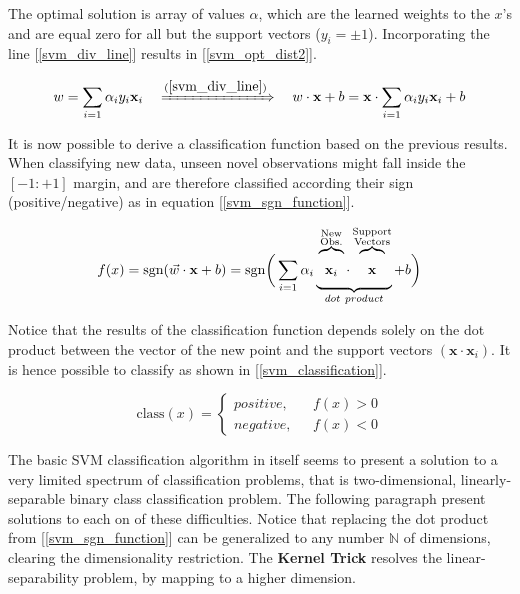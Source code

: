 	The optimal solution is array of values $\alpha$, which are the learned weights to the $x$'s and are equal zero for all but the support vectors ($y_i = \pm1 $). Incorporating the line [\ref{svm_div_line}] results in [\ref{svm_opt_dist2}].
	
	\begin{equation}
		w = \sum_{i=1}\alpha_i y_i \textbf{x}_i \ \ \ \xRightarrow[]{(\ref{svm_div_line})}
		\ \ \ w \cdot \textbf{x} + b = \textbf{x} \cdot  \sum_{i=1} \alpha_i y_i \textbf{x}_i  + b
		\label{svm_opt_dist2}
	\end{equation}
	
	It is now possible to derive a classification function based on the previous results. When classifying new data, unseen novel observations might fall inside the $[-1:+1]$ margin, and are therefore classified according their sign (positive/negative) as in equation [\ref{svm_sgn_function}].
	
	\begin{equation}
		f(x) = \text{sgn}(\vec{w} \cdot \textbf{x} + b)  =
		\text{sgn}\bigg( \sum_{i=1} \alpha_i
		\xunderbrace{
		 \xoverbrace{\textbf{x}_i}^{\substack{\text{New}\\ \text{Obs.}}}
	  \cdot 
	  \xoverbrace{\textbf{x}}^{\substack{\text{Support}\\ \text{Vectors}}}
		}_{dot \ product}
		 + b \bigg)
		\label{svm_sgn_function} 
	\end{equation}
	
	Notice that the results of the classification function depends solely on the dot product between the vector of the new point and the support vectors $(\textbf{x} \cdot\textbf{x}_i)$. It is hence possible to classify as shown in [\ref{svm_classification}].
	
	\begin{equation}
		\text{class}(x) = 
		\begin{cases}
			positive,\ \ \  &f(x) > 0 \\
			negative,\ \ \  &f(x) < 0
		\end{cases}
		\label{svm_classification}
	\end{equation}
	
	The basic SVM classification algorithm in itself seems to present a solution to a very limited spectrum of classification problems, that is two-dimensional, linearly-separable binary class classification problem. The following paragraph present solutions to each on of these difficulties. Notice that replacing the dot product from [\ref{svm_sgn_function}] can be generalized to any number $\mathbb{N}$ of dimensions, clearing the dimensionality restriction. The \textbf{Kernel Trick} resolves the linear-separability problem, by mapping to a higher dimension.
		
